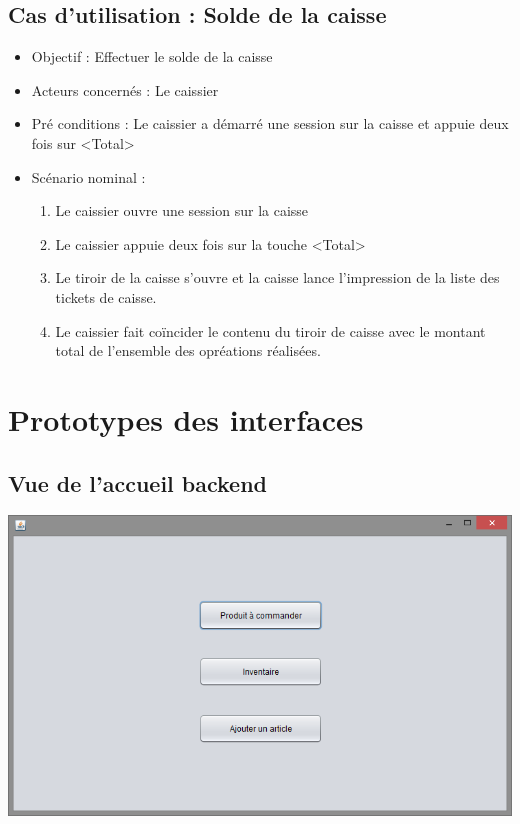 \subsection{Cas d'utilisation : Solde de la caisse}
\begin{itemize}
	\item Objectif : Effectuer le solde de la caisse
	\item Acteurs concernés : Le caissier
	\item Pré conditions : Le caissier a démarré une session sur la caisse et appuie deux fois sur <Total>
	\item Scénario nominal :
	\begin{enumerate}
		\item Le caissier ouvre une session sur la caisse
		\item Le caissier appuie deux fois sur la touche <Total>
		\item Le tiroir de la caisse s'ouvre et la caisse lance l'impression de la liste des tickets de caisse.
		\item Le caissier fait coïncider le contenu du tiroir de caisse avec le montant total de l'ensemble des opréations réalisées.
	\end{enumerate}
\end{itemize}




\section{Prototypes des interfaces}

\subsection{Vue de l'accueil backend}
\begin{center}
	\includegraphics[width=14cm]{Analyse/HomeView.png}
\end{center}

